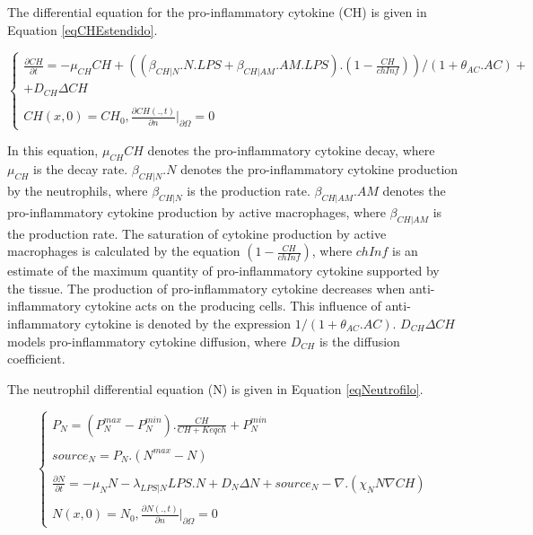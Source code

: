 \documentclass[10pt]{bmc_article}
\newenvironment{bmcformat}{\baselineskip20pt\sloppy\setboolean{publ}{false}}{\baselineskip20pt\sloppy}
\begin{document}
\begin{bmcformat}
The differential equation for the pro-inflammatory cytokine (CH) is given in Equation \ref{eqCHEstendido}.

\begin{equation}
\label{eqCHEstendido}
\begin{cases} 
\frac{\partial CH}{\partial t} = -\mu_{CH} CH + ((\beta _{CH|N}.N.LPS + \beta _{CH|AM}.AM.LPS).(1 - \frac{CH}{chInf}))/(1 + \theta_{AC}.AC)+ \\
 + D_{CH} \Delta CH \\ \\
CH(x,0) =  CH_0, \frac{\partial CH(.,t)}{\partial n} |_{\partial\Omega} = 0 
\end{cases}
\end{equation}

In this equation, $\mu_{CH} CH$ denotes the pro-inflammatory cytokine decay, where $\mu_{CH}$ is the decay rate. 
$\beta _{CH|N}.N$ denotes the pro-inflammatory cytokine production by the neutrophils, where $\beta _{CH|N}$ is the production rate. 
$\beta _{CH|AM}.AM$ denotes the pro-inflammatory cytokine production by active macrophages, where $\beta _{CH|AM}$ is the production rate. 
The saturation of cytokine production by active macrophages is calculated by the equation $(1 - \frac{CH}{chInf})$, where $chInf$ is an 
estimate of the maximum quantity of pro-inflammatory cytokine supported by the tissue. 
The production of pro-inflammatory cytokine decreases when anti-inflammatory cytokine acts on the producing cells. 
This influence of anti-inflammatory cytokine is denoted by the expression $1/(1 + \theta_{AC}.AC)$. 
$D_{CH} \Delta CH$ models pro-inflammatory cytokine diffusion, where $D_{CH}$ is the diffusion coefficient. 

The neutrophil differential equation (N) is given in Equation \ref{eqNeutrofilo}.

\begin{equation}
 \begin{cases}   
P_{N} = (P^{max}_{N}- P^{min}_{N}).\frac{CH}{CH + Keqch} + P^{min}_{N}\\\\
source_{N} = P_{N}.(N^{max} - N)\\\\
\frac{\partial N}{\partial t} = -\mu_N N -\lambda _{LPS|N} LPS. N + D_N \Delta N + source_{N} - \nabla. (\chi_N N \nabla CH) \\\\
N(x,0) = N_0, \frac{\partial N(.,t)}{\partial n} |_{\partial\Omega} = 0 
\end{cases} 
\label{eqNeutrofilo}
\end{equation}


\end{bmcformat}
\end{document}
